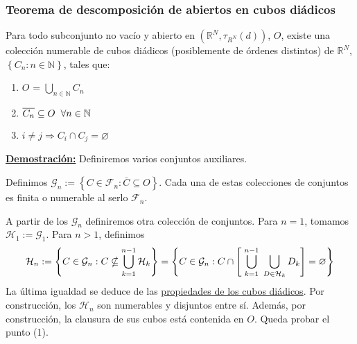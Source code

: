 \documentclass[12pt,a4paper]{article}
\newcommand{\R}{\mathbb{R}}
\newcommand{\N}{\mathbb{N}}
\newcounter{unit}[section]
\newcounter{chapter}[unit]
\renewcommand{\theunit}{\arabic{unit}}
\renewcommand{\thechapter}{\arabic{chapter}}
\renewcommand{\thesubsubsection}{\theunit.\thechapter.\arabic{subsubsection}}
\newcommand{\result}[1]{%
  \subsubsection{#1}%
  \label{result:\thesubsubsection}
}
\newcommand{\dem}{
    \noindent \underline{\textbf{Demostración:}}
}
\begin{document}
\vspace{8mm}
\result{Teorema de descomposición de abiertos en cubos diádicos}
\hspace{3mm}
Para todo subconjunto no vacío y abierto en $\left(\R^N, \tau_{R^N}(d)\right)$, $O$, existe una colección numerable
de cubos diádicos (posiblemente de órdenes distintos) de $\R^N$, $\left\{C_n : n \in \N\right\}$, tales que:
\begin{enumerate}[label=\arabic*.)]
    \item $O$ = $\displaystyle \bigcup_{n \in \N} C_n$
    \item $\overline{C_n} \subseteq O \hspace{2mm} \forall n \in \N$
    \item $i \neq j \Rightarrow C_i \cap C_j = \varnothing$
\end{enumerate}

\vspace{4mm}
\dem Definiremos varios conjuntos auxiliares.

\vspace{2mm}
Definimos $\mathcal{G}_n := \left\{C \in \mathcal{F}_n : \overline{C} \subseteq O\right\}$. Cada una de estas colecciones de conjuntos
es finita o numerable al serlo $\mathcal{F}_n$.

\vspace{2mm}
A partir de los $\mathcal{G}_n$ definiremos otra colección de conjuntos.
Para $n = 1$, tomamos $\mathcal{H}_1 := \mathcal{G}_1$.
Para $n >1$, definimos
$$\mathcal{H}_n := \left\{C \in \mathcal{G}_n : C \nsubseteq \displaystyle \bigcup_{k=1}^{n-1}\mathcal{H}_k \right\}
= \left\{C \in \mathcal{G}_n : C \cap \left[\hspace{1mm} \bigcup_{k=1}^{n-1} \hspace{1mm} \bigcup_{D \in \mathcal{H}_k} D_k\right] = \varnothing \right\}$$
La última igualdad se deduce de las \hyperref[result:0.2.4]{propiedades de los cubos diádicos}.
Por construcción, los $\mathcal{H}_n$ son numerables y disjuntos entre sí. Además, por construcción, la clausura de sus cubos
está contenida en $O$. Queda probar el punto (1).
\end{document}
